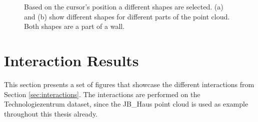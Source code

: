 \begin{figure}
\centering
{}
\caption{Based on the cursor's position a different shapes are selected. (a) and (b) show different shapes for different parts of the point cloud. Both shapes are a part of a wall. }
\label{fig:technologiezentrum_interactive_shape_detection}
\end{figure}


\section{Interaction Results}
\label{sec:interaction_results}

This section presents a set of figures that showcase the different interactions from Section \ref{sec:interactions}. The interactions are performed on the Technologiezentrum dataset, since the JB\_Haus point cloud is used as example throughout this thesis already. 

